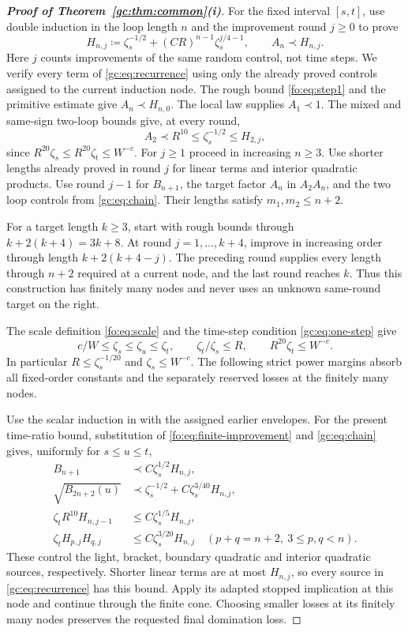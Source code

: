 \documentclass[11pt]{article}
\numberwithin{equation}{section}
\theoremstyle{remark}
\begin{document}
\begin{proof}[\textbf{Proof of Theorem~\ref{gc:thm:common}(i)}]
For the fixed interval $[s,t]$, use double induction in the loop
length $n$ and the improvement round $j\ge0$ to prove
\begin{equation}\label{fo:eq:finite-improvement}
 H_{n,j}\coloneqq\zeta_s^{-1/2}+(CR)^{n-1}\zeta_s^{j/4-1},\qquad
 A_n\prec H_{n,j}.
\end{equation}
Here $j$ counts improvements of the same random control, not time steps.
We verify every term of \eqref{gc:eq:recurrence} using only the already
proved controls assigned to the current induction node.
The rough bound \eqref{fo:eq:step1} and the primitive estimate give
$A_n\prec H_{n,0}$. The local law supplies $A_1\prec1$.
The mixed and same-sign two-loop bounds give, at every round,
\[
 A_2\prec R^{10}\le\zeta_s^{-1/2}\le H_{2,j},
\]
since $R^{20}\zeta_s\le R^{20}\zeta_t\le W^{-c}$.
For $j\ge1$ proceed in increasing $n\ge3$. Use shorter lengths
already proved in round $j$ for linear terms and interior quadratic
products. Use round $j-1$ for $B_{n+1}$, the target factor $A_n$ in
$A_2A_n$, and the two loop controls from \eqref{gc:eq:chain}.
Their lengths satisfy $m_1,m_2\le n+2$.

For a target length $k\ge3$, start with rough bounds through
$k+2(k+4)=3k+8$. At round $j=1,\ldots,k+4$, improve in increasing
order through length $k+2(k+4-j)$. The preceding round supplies every
length through $n+2$ required at a current node, and the last round
reaches $k$. Thus this construction has finitely many nodes and never
uses an unknown same-round target on the right.

The scale definition \eqref{fo:eq:scale} and the time-step condition
\eqref{gc:eq:one-step} give
\[
 c/W\le\zeta_s\le\zeta_u\le\zeta_t,\qquad
 \zeta_t/\zeta_s\le R,\qquad R^{20}\zeta_t\le W^{-c}.
\]
In particular $R\le\zeta_s^{-1/20}$ and $\zeta_s\le W^{-c}$.
The following strict power margins absorb all fixed-order constants
and the separately reserved losses at the finitely many nodes.

Use the scalar induction in \cite[Lemma~7.18, Appendix~A.8]{TYY}
with the assigned earlier envelopes. For the present time-ratio bound,
substitution of \eqref{fo:eq:finite-improvement} and \eqref{gc:eq:chain}
gives, uniformly for $s\le u\le t$,
\[
 \begin{aligned}
 B_{n+1}&\prec C\zeta_s^{1/2}H_{n,j},\\
 \sqrt{B_{2n+2}(u)}&\prec\zeta_s^{-1/2}
                       +C\zeta_s^{3/40}H_{n,j},\\
 \zeta_tR^{10}H_{n,j-1}&\le C\zeta_s^{1/5}H_{n,j},\\
 \zeta_tH_{p,j}H_{q,j}&\le C\zeta_s^{3/20}H_{n,j}
             \quad(p+q=n+2,\ 3\le p,q<n).
 \end{aligned}
\]
These control the light, bracket, boundary quadratic and interior
quadratic sources, respectively. Shorter linear terms are at most
$H_{n,j}$, so every source in \eqref{gc:eq:recurrence} has this bound.
Apply its adapted stopped implication at this node and continue through
the finite cone. Choosing smaller losses at its finitely many nodes
preserves the requested final domination loss.


\end{proof}
\end{document}
